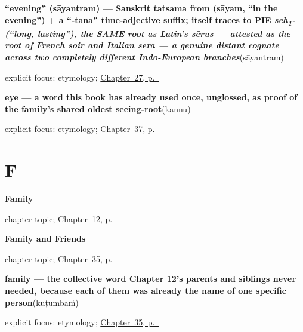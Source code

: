 \noindent\begin{minipage}[t]{\linewidth}
\raggedright
\textbf{\textquotedblleft{}evening\textquotedblright{} (sāyantram) — Sanskrit tatsama from  (sāyam, \textquotedblleft{}in the evening\textquotedblright{}) + a \textquotedblleft{}-tana\textquotedblright{} time-adjective suffix;  itself traces to PIE \emph{seh\textsubscript{1}- (\textquotedblleft{}long, lasting\textquotedblright{}), the SAME root as Latin's sērus — attested as the root of French soir and Italian sera — a genuine distant cognate across two completely different Indo-European branches}}\enspace\emph{}\enspace(sāyantram)\par
\footnotesize explicit focus: etymology; \hyperref[ch:te-evening]{Chapter~27, p.~\pageref*{ch:te-evening}}
\end{minipage}\par\smallskip

\noindent\begin{minipage}[t]{\linewidth}
\raggedright
\textbf{eye — a word this book has already used once, unglossed, as proof of the family's shared oldest seeing-root}\enspace\emph{}\enspace(kannu)\par
\footnotesize explicit focus: etymology; \hyperref[ch:te-face-words]{Chapter~37, p.~\pageref*{ch:te-face-words}}
\end{minipage}\par\smallskip

\section*{F}

\noindent\begin{minipage}[t]{\linewidth}
\raggedright
\textbf{Family}\par
\footnotesize chapter topic; \hyperref[ch:te-family]{Chapter~12, p.~\pageref*{ch:te-family}}
\end{minipage}\par\smallskip

\noindent\begin{minipage}[t]{\linewidth}
\raggedright
\textbf{Family and Friends}\par
\footnotesize chapter topic; \hyperref[ch:te-family-and-friends]{Chapter~35, p.~\pageref*{ch:te-family-and-friends}}
\end{minipage}\par\smallskip

\noindent\begin{minipage}[t]{\linewidth}
\raggedright
\textbf{family — the collective word Chapter 12's parents and siblings never needed, because each of them was already the name of one specific person}\enspace\emph{}\enspace(kuṭumbaṁ)\par
\footnotesize explicit focus: etymology; \hyperref[ch:te-family-and-friends]{Chapter~35, p.~\pageref*{ch:te-family-and-friends}}
\end{minipage}\par\smallskip

